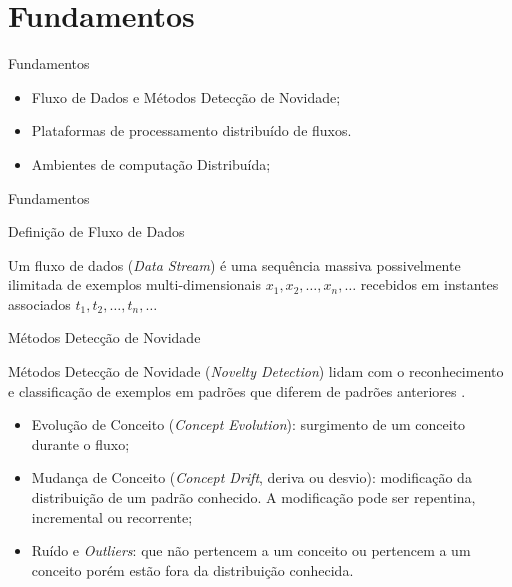 \documentclass[aspectratio=1610,10pt]{beamer}
\newcommand{\nota}[1]{\hspace*{-0.5cm}\textit{{\color[rgb]{1,0,0}Nota: #1}}}
\begin{document}
\section{Fundamentos}
\begin{frame}[fragile]{Fundamentos}
\begin{itemize}
  \item Fluxo de Dados e Métodos Detecção de Novidade;
  \item Plataformas de processamento distribuído de fluxos.
  \item Ambientes de computação Distribuída;
\end{itemize}
\end{frame}

\begin{frame}[fragile]{Fundamentos}
  \begin{block}{Definição de Fluxo de Dados}
    
    \vspace{1mm}

    Um fluxo de dados (\textit{Data Stream}) é uma sequência massiva possivelmente
    ilimitada de exemplos multi-dimensionais $x_1, x_2, \dots, x_n, \dots$
    recebidos em instantes associados $t_1, t_2, \dots, t_n, \dots$
  \end{block}

  \begin{alertblock}{Métodos Detecção de Novidade}
    
    \vspace{1mm}
    Métodos Detecção de Novidade (\emph{Novelty Detection}) lidam com o reconhecimento e
    classificação de exemplos em padrões que diferem de padrões anteriores
    \cite{Gama2010}.
    \begin{itemize}%
      
      \item Evolução de Conceito (\emph{Concept Evolution}): surgimento de um conceito durante
      o fluxo;
      
      \item Mudança de Conceito (\emph{Concept Drift}, deriva ou desvio): modificação da
      distribuição de um padrão conhecido. A modificação pode ser repentina,
      incremental ou recorrente;
      
      \item Ruído e \emph{Outliers}: que não pertencem a um conceito ou
      pertencem a um conceito porém estão fora da distribuição conhecida.
      
    \end{itemize}
  \end{alertblock}
\end{frame}
\end{document}
